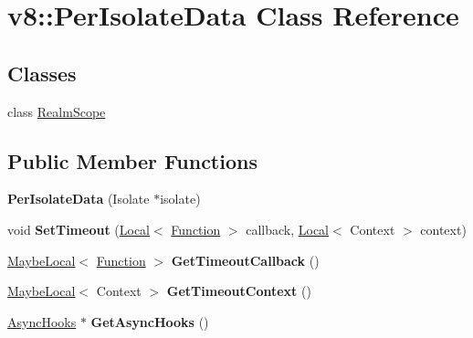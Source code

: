 \hypertarget{classv8_1_1PerIsolateData}{}\section{v8\+:\+:Per\+Isolate\+Data Class Reference}
\label{classv8_1_1PerIsolateData}
\subsection*{Classes}
\begin{DoxyCompactItemize}
\item 
class \mbox{\hyperlink{classv8_1_1PerIsolateData_1_1RealmScope}{Realm\+Scope}}
\end{DoxyCompactItemize}
\subsection*{Public Member Functions}
\begin{DoxyCompactItemize}
\item 
\mbox{\label{classv8_1_1PerIsolateData_aa17501de2d70dd2fc3e7cbbe32f9b182}} 
{\bfseries Per\+Isolate\+Data} (Isolate $\ast$isolate)
\item 
\mbox{\label{classv8_1_1PerIsolateData_a80d8e2ce79dc5660f1cede023f4f8a3f}} 
void {\bfseries Set\+Timeout} (\mbox{\hyperlink{classv8_1_1Local}{Local}}$<$ \mbox{\hyperlink{classv8_1_1Function}{Function}} $>$ callback, \mbox{\hyperlink{classv8_1_1Local}{Local}}$<$ Context $>$ context)
\item 
\mbox{\label{classv8_1_1PerIsolateData_a84e4fa985dcc406d8fd12b95119a2d4b}} 
\mbox{\hyperlink{classv8_1_1MaybeLocal}{Maybe\+Local}}$<$ \mbox{\hyperlink{classv8_1_1Function}{Function}} $>$ {\bfseries Get\+Timeout\+Callback} ()
\item 
\mbox{\label{classv8_1_1PerIsolateData_a26294e890743a44296d795218c738c0e}} 
\mbox{\hyperlink{classv8_1_1MaybeLocal}{Maybe\+Local}}$<$ Context $>$ {\bfseries Get\+Timeout\+Context} ()
\item 
\mbox{\label{classv8_1_1PerIsolateData_aa34af1f6db6b32621bad44ef98a2e08e}} 
\mbox{\hyperlink{classv8_1_1AsyncHooks}{Async\+Hooks}} $\ast$ {\bfseries Get\+Async\+Hooks} ()
\end{DoxyCompactItemize}
